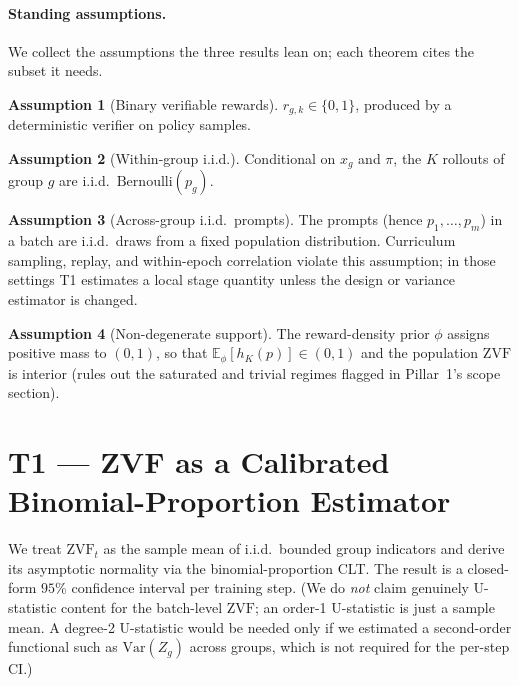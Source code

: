 \documentclass[11pt]{article}
\theoremstyle{plain}
\theoremstyle{definition}
\newtheorem{assumption}{Assumption}
\theoremstyle{remark}
\newcommand{\ZVF}{\ensuremath{\mathrm{ZVF}}}
\newcommand{\Var}{\ensuremath{\mathrm{Var}}}
\newcommand{\E}{\mathbb{E}}
\newcommand{\1}{\mathbb{1}}
\newcommand{\Bern}{\mathrm{Bernoulli}}
\begin{document}
\paragraph{Standing assumptions.} We collect the assumptions the three results
lean on; each theorem cites the subset it needs.
\begin{assumption}[Binary verifiable rewards]\label{ass:binary}
$r_{g,k}\in\{0,1\}$, produced by a deterministic verifier on policy samples.
\end{assumption}
\begin{assumption}[Within-group i.i.d.]\label{ass:within-iid}
Conditional on $x_g$ and $\pi$, the $K$ rollouts of group $g$ are i.i.d.\
$\Bern(p_g)$.
\end{assumption}
\begin{assumption}[Across-group i.i.d.\ prompts]\label{ass:across-iid}
The prompts (hence $p_1,\dots,p_m$) in a batch are i.i.d.\ draws from a fixed
population distribution. Curriculum sampling, replay, and within-epoch
correlation violate this assumption; in those settings T1 estimates a local
stage quantity unless the design or variance estimator is changed.
\end{assumption}
\begin{assumption}[Non-degenerate support]\label{ass:nondegen}
The reward-density prior $\phi$ assigns positive mass to $(0,1)$, so that
$\E_\phi[h_K(p)] \in (0,1)$ and the population \ZVF{} is interior (rules out
the saturated and trivial regimes flagged in Pillar~1's scope section).
\end{assumption}

\section{T1 --- ZVF as a Calibrated Binomial-Proportion Estimator}\label{sec:T1}
We treat $\ZVF_t$ as the sample mean of i.i.d.\ bounded group indicators and
derive its asymptotic normality via the binomial-proportion CLT. The result is
a closed-form $95\%$ confidence interval per training step. (We do \emph{not}
claim genuinely U-statistic content for the batch-level \ZVF{}; an order-1
U-statistic is just a sample mean. A degree-2 U-statistic would be needed only
if we estimated a second-order functional such as $\Var(Z_g)$ across groups,
which is not required for the per-step CI.)
\end{document}
